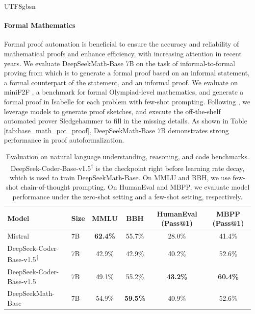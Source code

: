 \documentclass[11pt, a4paper, logo, copyright, nonumbering]{deepseek}
\newcommand{\spmath}{DeepSeekMath}
\begin{document}
\begin{CJK*}{UTF8}{gbsn}
\paragraph{Formal Mathematics}

Formal proof automation is beneficial to ensure the accuracy and reliability of mathematical proofs and enhance efficiency, with increasing attention in recent years.
We evaluate \spmath-Base 7B on the task of informal-to-formal proving from \citep{dsp_proof} which is to generate a formal proof based on an informal statement, a formal counterpart of the statement, and an informal proof.
We evaluate on miniF2F \citep{minif2f}, a benchmark for formal Olympiad-level mathematics, and generate a formal proof in Isabelle for each problem with few-shot prompting.
Following \cite{dsp_proof}, we leverage models to generate proof sketches, and execute the off-the-shelf automated prover Sledgehammer \citep{sledgehammer} to fill in the missing details.
As shown in Table \ref{tab:base_math_pot_proof}, \spmath-Base 7B demonstrates strong performance in proof autoformalization.

\begingroup
\setlength{\tabcolsep}{3pt} %
\renewcommand{\arraystretch}{1} %
\begin{table}[htb]
    \centering
\begin{small}

\begin{tabular}{llcccc} 
\toprule
\multicolumn{1}{l}{Model} &\multicolumn{1}{l}{Size}                      & MMLU   & BBH    & HumanEval (Pass@1) & MBPP (Pass@1)  \\ 
\midrule
Mistral & 7B                      & \textbf{62.4\%} & 55.7\% & 28.0\%             & 41.4\%         \\
\midrule
DeepSeek-Coder-Base-v1.5\textsuperscript{$\dag$} & 7B & 42.9\% & 42.9\% & 40.2\%             & 52.6\%         \\
DeepSeek-Coder-Base-v1.5 & 7B          & 49.1\% & 55.2\% & \textbf{43.2\%}             & \textbf{60.4\%}         \\ 
\midrule
\spmath-Base & 7B            & 54.9\% & \textbf{59.5\%} & 40.9\%             & 52.6\%         \\
\bottomrule
\end{tabular}
\end{small}
    \caption{
    Evaluation on natural language understanding, reasoning, and code benchmarks.
    DeepSeek-Coder-Base-v1.5\textsuperscript{$\dag$} is the checkpoint right before learning rate decay, which is used to train \spmath-Base.
    On MMLU and BBH, we use few-shot chain-of-thought prompting.
    On HumanEval and MBPP, we evaluate model performance under the zero-shot setting and a few-shot setting, respectively.
    }
    \label{tab:understanding_reasoning_code}
\end{table}
\endgroup


\end{CJK*}
\end{document}
